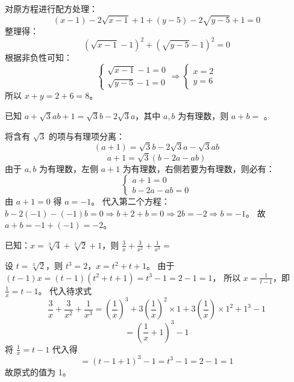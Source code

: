 \begin{questions}
\begin{solution}
对原方程进行配方处理：
\[
(x - 1) - 2\sqrt{x - 1} + 1 + (y - 5) - 2\sqrt{y - 5} + 1 = 0
\]
整理得：
\[
\left(\sqrt{x - 1} - 1\right)^2 + \left(\sqrt{y - 5} - 1\right)^2 = 0
\]
根据非负性可知：
\[
\begin{cases} \sqrt{x - 1} - 1 = 0 \\ \sqrt{y - 5} - 1 = 0 \end{cases} \Rightarrow \begin{cases} x = 2 \\ y = 6 \end{cases}
\]
所以 $x + y = 2 + 6 = 8$。
\end{solution}

\question 已知 $a + \sqrt{3}ab + 1 = \sqrt{3}b - 2\sqrt{3}a$，其中 $a, b$ 为有理数，则 $a + b =$ \underline{\hspace{1cm}}。

\begin{solution}
将含有 $\sqrt{3}$ 的项与有理项分离：
\[
(a + 1) = \sqrt{3}b - 2\sqrt{3}a - \sqrt{3}ab
\]
\[
a + 1 = \sqrt{3}(b - 2a - ab)
\]
由于 $a, b$ 为有理数，左侧 $a + 1$ 为有理数，右侧若要为有理数，则必有：
\[
\begin{cases} a + 1 = 0 \\ b - 2a - ab = 0 \end{cases}
\]
由 $a + 1 = 0$ 得 $a = -1$。
代入第二个方程：$b - 2(-1) - (-1)b = 0 \Rightarrow b + 2 + b = 0 \Rightarrow 2b = -2 \Rightarrow b = -1$。
故 $a + b = -1 + (-1) = -2$。
\end{solution}

\question
已知：$x = \sqrt[3]{4} + \sqrt[3]{2} + 1$，则 $\frac{3}{x} + \frac{3}{x^2} + \frac{1}{x^3} =$

\begin{solution}
设 $t = \sqrt[3]{2}$，则 $t^3 = 2$，$x = t^2 + t + 1$。
由于 $(t - 1)x = (t - 1)(t^2 + t + 1) = t^3 - 1 = 2 - 1 = 1$，
所以 $x = \frac{1}{t - 1}$，即 $\frac{1}{x} = t - 1$。
代入待求式
\[
\frac{3}{x} + \frac{3}{x^2} + \frac{1}{x^3} = \left( \frac{1}{x} \right)^3 + 3\left( \frac{1}{x} \right)^2 \times 1 + 3\left( \frac{1}{x} \right) \times 1^2 + 1^3 - 1
\]
\[
= \left( \frac{1}{x} + 1 \right)^3 - 1
\]
将 $\frac{1}{x} = t - 1$ 代入得
\[
= (t - 1 + 1)^3 - 1 = t^3 - 1 = 2 - 1 = 1
\]
故原式的值为 1。
\end{solution}


\end{questions}
